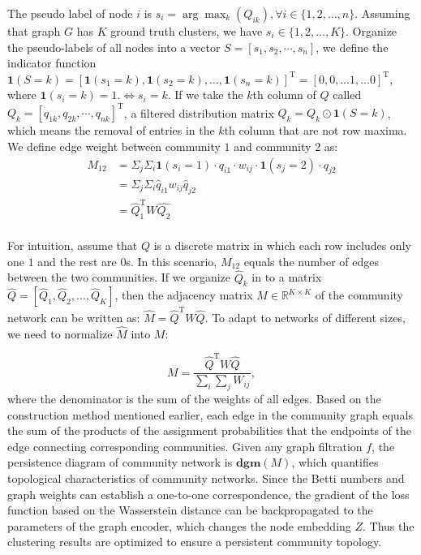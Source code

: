 \documentclass[letterpaper]{article} %
\begin{document}
The pseudo label of node $i$ is $s_i = \arg\max_k(Q_{ik}), \forall i \in \{1, 2, \ldots,n\}$.  Assuming that graph $G$ has $K$ ground truth clusters, we have $s_i\in \{1,2,\dots,K\}$.  Organize the pseudo-labels of all nodes into a vector $S=[s_1, s_2,\cdots, s_n]$, we define the indicator function  $ \mathbf{1}\left(S=k\right)=[\mathbf{1}\left(s_1=k\right),\mathbf{1}\left(s_2=k\right), \ldots, \mathbf{1}\left(s_n=k\right)]^\mathrm{T}=[0,0, \ldots 1, \ldots 0]^\mathrm{T}$, where $\mathbf{1}\left(s_i=k\right)=1. \iff  s_i=k$. If we take the $k$th column of $Q$ called $Q_{k}=[q_{1 k}, q_{2 k}, \cdots, q_{n k}]^\mathrm{T}$, 
 a filtered distribution matrix $\hat{Q}_{k}=Q_{k} \odot \mathbf{1}\left(S=k\right)$, which means the removal of entries in the $k$th column that are not row maxima. We define edge weight between community $1$ and community $2$ as:
\begin{equation}
\begin{aligned}
    M_{1 2}
    & =\Sigma_j \Sigma_i \mathbf{1}\left(s_i=1\right) \cdot q_{i 1} \cdot w_{i j} \cdot \mathbf{1}\left(s_j=2\right) \cdot q_{j 2} \\
    & =\Sigma_j \Sigma_i \hat{q}_{i 1} w_{i j} \hat{q}_{j 2} \\
    & =\hat{Q}^\mathrm{T}_{1} W \hat{Q_{2}}\\
\end{aligned}
\end{equation}

For intuition, assume that $Q$ is a discrete matrix in which each row includes only one $1$ and the rest are $0$s. In this scenario, $M_{1 2}$ equals the number of edges between the two communities. If we organize $\hat{Q}_{k}$ in to a matrix $\hat{Q}= [\hat{Q}_1, \hat{Q}_2, \dots, \hat{Q}_K]$, then the adjacency matrix $M \in \mathbb{R}^{K \times K}$ of the community network can be written as: $\hat{M}=\hat{Q}^\mathrm{T} W \hat{Q}$. To adapt to networks of different sizes, we need to normalize $\hat{M}$ into $M$:

\begin{equation}M =\frac{\hat{Q}^\mathrm{T} W \hat{Q}}{\sum_i\sum_j W_{ij}},\end{equation}
where the denominator is the sum of the weights of all edges. Based on the construction method mentioned earlier, each edge in the community graph equals the sum of the products of the assignment probabilities that the endpoints of the edge connecting corresponding communities. Given any graph filtration $f$, the persistence diagram of community network is $\mathbf{dgm}( M)$, which quantifies topological characteristics of community networks.  Since the Betti numbers and graph weights can establish a one-to-one correspondence,  the gradient of the loss function based on the Wasserstein distance can be backpropagated to the parameters of the graph encoder, which changes the node embedding $Z$. Thus the clustering results are optimized to ensure a persistent community topology.
\end{document}
